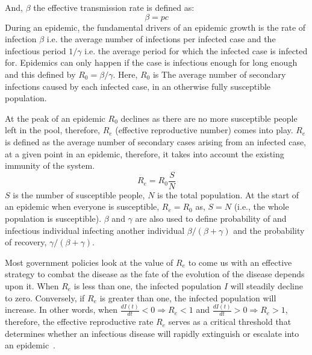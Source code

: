 \documentclass[tikz,fleqn,12pt]{wlscirep}
\begin{document}
And, $\beta$ the effective transmission rate is defined as:
\begin{equation}
  \beta = p c
  \label{eq:beta_effective_transmission_rate}
\end{equation}
During an epidemic, the fundamental drivers of an epidemic growth is the rate of infection $\beta$ i.e. the average number of infections per infected case and the infectious period $1/\gamma$ i.e. the average period for which the infected case is infected for. Epidemics can only happen if the case is infectious enough for long enough and this defined by $R_0 = \beta / \gamma$. Here, $R_0$ is The average number of secondary infections caused by each infected case, in an otherwise fully susceptible population.

At the peak of an epidemic $R_0$ declines as there are no more susceptible people left in the pool, therefore, $R_e$ (effective reproductive number) comes into play. $R_e$ is defined as the average number of secondary cases arising from an infected case, at a given point in an epidemic, therefore, it takes into account the existing immunity of the system. 
\begin{equation}
  R_e = R_0 \frac{S}{N}
  \label{eq:R_effective}
\end{equation}
$S$ is the number of susceptible people, $N$ is the total population. At the start of an epidemic when everyone is susceptible, $R_e = R_0$ as, $S = N$ (i.e., the whole population is susceptible). $\beta$ and $\gamma$ are also used to define probability of and infectious individual infecting another individual $\beta / (\beta + \gamma)$ and the probability of recovery, $\gamma / (\beta + \gamma)$.

Most government policies look at the value of $R_e$ to come us with an effective strategy to combat the disease as the fate of the evolution of the disease depends upon it. When $R_e$ is less than one, the infected population $I$ will steadily decline to zero. Conversely, if $R_e$ is greater than one, the infected population will increase. In other words, when $\frac{dI(t)}{dt} < 0 \Rightarrow R_e < 1$ and $\frac{dI(t)}{dt} > 0 \Rightarrow R_e > 1$, therefore, the effective reproductive rate $R_e$ serves as a critical threshold that determines whether an infectious disease will rapidly extinguish or escalate into an epidemic~\cite{Cooper2020}.
\end{document}

